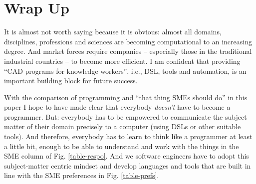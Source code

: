 \documentclass[runningheads]{llncs}
\newcommand{\fig}[1]{Fig. \ref{#1}}  %
\begin{document}
\section{Wrap Up}

It is almost not worth saying because it is obvious: almost all domains,
disciplines, professions and sciences are becoming computational to an 
increasing degree. And market forces require companies -- especially those
in the traditional industrial countries -- to become more efficient. I
am confident that providing ``CAD programs for knowledge workers'', i.e.,
DSL, tools and automation, is an important building block for future success.

With the comparison of programming and ``that thing SMEs should do'' in this
paper I hope to have made clear that everybody \emph{doesn't} have to become a
programmer.
But: everybody has to be empowered to communicate the subject matter of their
domain precisely to a computer (using DSLs or other suitable tools). And
therefore, everybody has to learn to think like a programmer at least a little
bit, enough to be able to understand and work with the things in the SME column
of \fig{table-respo}. And we software engineers have to adopt this
subject-matter centric mindset and develop languages and tools that are built in
line with the SME preferences in \fig{table-prefs}.







\end{document}
